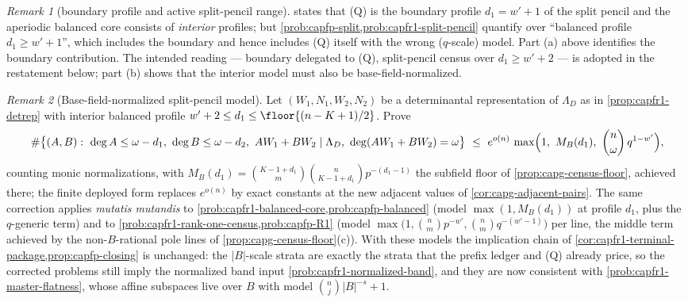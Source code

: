 \documentclass[11pt]{article}
\theoremstyle{definition}
\theoremstyle{remark}
\newtheorem{remark}[remark]{Remark}
\newcommand{\B}{B}
\begin{document}
\begin{remark}[boundary profile and active split-pencil range]
\label{rem:capg-boundary-offbyone}
 states that \textup{(Q)} is the boundary
profile $d_1=w'+1$ of the split pencil and the aperiodic balanced core
consists of \emph{interior} profiles; but
\cref{prob:capfp-split,prob:capfr1-split-pencil} quantify over
``balanced profile $d_1\ge w'+1$'', which includes the boundary and
hence includes \textup{(Q)} itself with the wrong ($q$-scale) model.
Part \textup{(a)} above identifies the boundary contribution.  The intended
reading --- boundary delegated to \textup{(Q)}, split-pencil census over
$d_1\ge w'+2$ --- is adopted in the restatement below; part \textup{(b)}
shows that the interior model must also be base-field-normalized.
\end{remark}

\begin{remark}[Base-field-normalized split-pencil model]
\label{prob:capg-split-pencil-B}
Let $(W_1,N_1,W_2,N_2)$ be a determinantal representation of
$\Lambda_D$ as in \cref{prop:capfr1-detrep} with interior balanced
profile $w'+2\le d_1\le\floor{(n-K+1)/2}$.  Prove
\[
        \#\bigl\{(A,B):\ \deg A\le\omega-d_1,\ \deg B\le\omega-d_2,\
        AW_1+BW_2\mid\Lambda_D,\ \deg(AW_1+BW_2)=\omega\bigr\}
        \ \le\ e^{o(n)}\,
        \max\Bigl(1,\ M_{\B}(d_1),\ \binom n\omega\,q^{1-w'}\Bigr),
\]
counting monic normalizations, with
$M_{\B}(d_1)=\binom{K-1+d_1}{m}\binom n{K-1+d_1}p^{-(d_1-1)}$ the
subfield floor of \cref{prop:capg-census-floor}, achieved there; the
finite deployed form replaces $e^{o(n)}$ by exact constants at the new
adjacent values of \cref{cor:capg-adjacent-pairs}.  The same
correction applies \emph{mutatis mutandis} to
\cref{prob:capfr1-balanced-core,prob:capfp-balanced} (model
$\max(1,M_{\B}(d_1))$ at profile $d_1$, plus the $q$-generic term) and to
\cref{prob:capfr1-rank-one-census,prob:capfp-R1} (model
$\max\bigl(1,\binom nm p^{-w'},\binom nm q^{-(w'-1)}\bigr)$ per line,
the middle term achieved by the non-$\B$-rational pole lines of
\cref{prop:capg-census-floor}\textup{(c)}).  With these models the
implication chain of
\cref{cor:capfr1-terminal-package,prop:capfp-closing} is unchanged: the
$|\B|$-scale strata are exactly the strata that the prefix ledger and
\textup{(Q)} already price, so the corrected problems still imply the
normalized band input \cref{prob:capfr1-normalized-band}, and they are
now consistent with \cref{prob:capfr1-master-flatness}, whose affine
subspaces live over $\B$ with model $\binom nj|\B|^{-s}+1$.
\end{remark}
\end{document}
